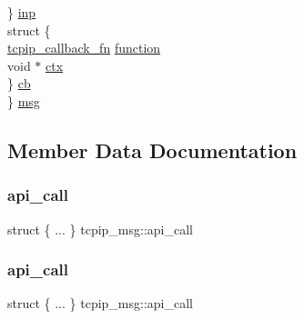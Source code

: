 \begin{DoxyCompactItemize}
\begin{tabbing}
\>\} \hyperlink{structtcpip__msg_af7f9b9f211bf2892eae44bb9bf47c30c}{inp}\\
\>struct \{\\
\>\>\hyperlink{openmote-cc2538_2lwip_2src_2include_2lwip_2tcpip_8h_a35203296bb838f3b493839ffc6e7285d}{tcpip\_callback\_fn} \hyperlink{structtcpip__msg_ad294175efea90f55493a9465a65c8e4c}{function}\\
\>\>void $\ast$ \hyperlink{structtcpip__msg_a7edb4f4e181f9cffbef13dc7a7d41d8b}{ctx}\\
\>\} \hyperlink{structtcpip__msg_a829133523fb191f0336dba26fca6d9fe}{cb}\\
\} \hyperlink{structtcpip__msg_a89ebc2527511a6cf3434ae2be61e3c8e}{msg}\\

\end{tabbing}\end{DoxyCompactItemize}


\subsection{Member Data Documentation}
\mbox{\label{structtcpip__msg_ae977af1c34a11d2a7fbbcc90ec0122da}} 
\subsubsection{\texorpdfstring{api\+\_\+call}{api\_call}\hspace{0.1cm}{\footnotesize\ttfamily [1/2]}}
{\footnotesize\ttfamily struct \{ ... \}   tcpip\+\_\+msg\+::api\+\_\+call}

\mbox{\label{structtcpip__msg_ab7720d6d46b764343efef8ae65f0afe9}} 
\subsubsection{\texorpdfstring{api\+\_\+call}{api\_call}\hspace{0.1cm}{\footnotesize\ttfamily [2/2]}}
{\footnotesize\ttfamily struct \{ ... \}   tcpip\+\_\+msg\+::api\+\_\+call}

\mbox{\label{structtcpip__msg_a4260e8402260eb7ff6e6ea39fb410846}} 
